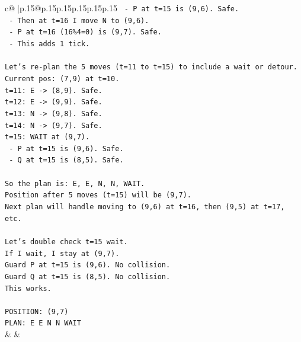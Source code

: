 \documentclass{article}
\begin{document}
{\begin{supertabular}{c@{$\;$}|p{.15\linewidth}@{}p{.15\linewidth}p{.15\linewidth}p{.15\linewidth}p{.15\linewidth}p{.15\linewidth}}
{{{\texttt{  {-} P at t=15 is (9,6). Safe.} \\
\texttt{  {-} Then at t=16 I move N to (9,6).} \\
\texttt{  {-} P at t=16 (16\%4=0) is (9,7). Safe.} \\
\texttt{  {-} This adds 1 tick.} \\
\\ 
\texttt{Let's re{-}plan the 5 moves (t=11 to t=15) to include a wait or detour.} \\
\texttt{Current pos: (7,9) at t=10.} \\
\texttt{t=11: E {-}> (8,9). Safe.} \\
\texttt{t=12: E {-}> (9,9). Safe.} \\
\texttt{t=13: N {-}> (9,8). Safe.} \\
\texttt{t=14: N {-}> (9,7). Safe.} \\
\texttt{t=15: WAIT at (9,7).} \\
\texttt{  {-} P at t=15 is (9,6). Safe.} \\
\texttt{  {-} Q at t=15 is (8,5). Safe.} \\
\\ 
\texttt{So the plan is: E, E, N, N, WAIT.} \\
\texttt{Position after 5 moves (t=15) will be (9,7).} \\
\texttt{Next plan will handle moving to (9,6) at t=16, then (9,5) at t=17, etc.} \\
\\ 
\texttt{Let's double check t=15 wait.} \\
\texttt{If I wait, I stay at (9,7).} \\
\texttt{Guard P at t=15 is (9,6). No collision.} \\
\texttt{Guard Q at t=15 is (8,5). No collision.} \\
\texttt{This works.} \\
\\ 
\texttt{POSITION: (9,7)} \\
\texttt{PLAN: E E N N WAIT} \\
            }
        }
    }
    & & \\ \\


\end{supertabular}}
\end{document}
